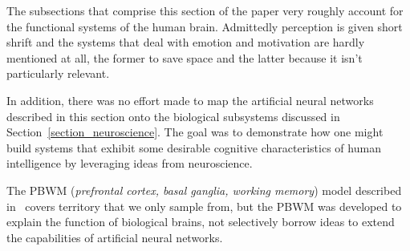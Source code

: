 



The subsections that comprise this section of the paper very roughly account for the functional systems of the human brain. Admittedly perception is given short shrift and the systems that deal with emotion and motivation are hardly mentioned at all, the former to save space and the latter because it isn't particularly relevant.

In addition, there was no effort made to map the artificial neural networks described in this section onto the biological subsystems discussed in Section~\ref{section_neuroscience}. The goal was to demonstrate how one might build systems that exhibit some desirable cognitive characteristics of human intelligence by leveraging ideas from neuroscience.

The PBWM ({\it{prefrontal cortex, basal ganglia, working memory}}) model described in~\cite{OReillyandFrankNC-06,HazyetalPTRS-07} covers territory that we only sample from, but the PBWM was developed to explain the function of biological brains, not selectively borrow ideas to extend the capabilities of artificial neural networks.

